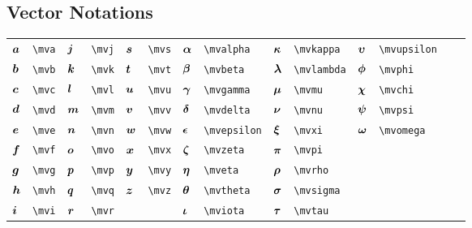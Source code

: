 \documentclass{article}
\begin{document}
\subsection{Vector Notations}
\begin{longtable}{*{14}{l}}
${\bm a}$ & \lstinline`\mva` & ${\bm j}$ & \lstinline`\mvj` & ${\bm s}$ & \lstinline`\mvs` & ${\bm \alpha}$ & \lstinline`\mvalpha` & ${\bm \kappa}$ & \lstinline`\mvkappa` & ${\bm \upsilon}$ & \lstinline`\mvupsilon`\\
${\bm b}$ & \lstinline`\mvb` & ${\bm k}$ & \lstinline`\mvk` & ${\bm t}$ & \lstinline`\mvt` & ${\bm \beta}$ & \lstinline`\mvbeta` & ${\bm \lambda}$ & \lstinline`\mvlambda` & ${\bm \phi}$ & \lstinline`\mvphi`\\
${\bm c}$ & \lstinline`\mvc` & ${\bm l}$ & \lstinline`\mvl` & ${\bm u}$ & \lstinline`\mvu` & ${\bm \gamma}$ & \lstinline`\mvgamma` & ${\bm \mu}$ & \lstinline`\mvmu` & ${\bm \chi}$ & \lstinline`\mvchi`\\
${\bm d}$ & \lstinline`\mvd` & ${\bm m}$ & \lstinline`\mvm` & ${\bm v}$ & \lstinline`\mvv` & ${\bm \delta}$ & \lstinline`\mvdelta` & ${\bm \nu}$ & \lstinline`\mvnu` & ${\bm \psi}$ & \lstinline`\mvpsi`\\
${\bm e}$ & \lstinline`\mve` & ${\bm n}$ & \lstinline`\mvn` & ${\bm w}$ & \lstinline`\mvw` & ${\bm \epsilon}$ & \lstinline`\mvepsilon` & ${\bm \xi}$ & \lstinline`\mvxi` & ${\bm \omega}$ & \lstinline`\mvomega`\\
${\bm f}$ & \lstinline`\mvf` & ${\bm o}$ & \lstinline`\mvo` & ${\bm x}$ & \lstinline`\mvx` & ${\bm \zeta}$ & \lstinline`\mvzeta` & ${\bm \pi}$ & \lstinline`\mvpi` & \\
${\bm g}$ & \lstinline`\mvg` & ${\bm p}$ & \lstinline`\mvp` & ${\bm y}$ & \lstinline`\mvy` & ${\bm \eta}$ & \lstinline`\mveta` & ${\bm \rho}$ & \lstinline`\mvrho` & \\
${\bm h}$ & \lstinline`\mvh` & ${\bm q}$ & \lstinline`\mvq` & ${\bm z}$ & \lstinline`\mvz` & ${\bm \theta}$ & \lstinline`\mvtheta` & ${\bm \sigma}$ & \lstinline`\mvsigma` & \\
${\bm i}$ & \lstinline`\mvi` & ${\bm r}$ & \lstinline`\mvr` &  &  & ${\bm \iota}$ & \lstinline`\mviota` & ${\bm \tau}$ & \lstinline`\mvtau` & \\
\end{longtable}
\end{document}
